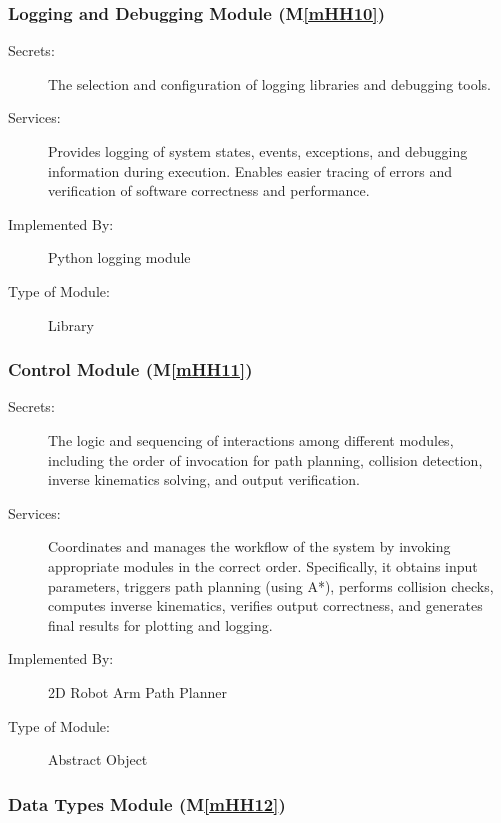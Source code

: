 \documentclass[12pt, titlepage]{article}
\newcommand{\mref}[1]{M\ref{#1}}
\begin{document}
\subsubsection{Logging and Debugging Module (\mref{mHH10})}

\begin{description}
\item[Secrets:] The selection and configuration of logging libraries and debugging tools.
\item[Services:] Provides logging of system states, events, exceptions, and debugging information during execution. Enables easier tracing of errors and verification of software correctness and performance.
\item[Implemented By:] Python logging module
\item[Type of Module:] Library
\end{description}

\subsubsection{Control Module (\mref{mHH11})}

\begin{description} \item[Secrets:] The logic and sequencing of interactions among different modules, including the order of invocation for path planning, collision detection, inverse kinematics solving, and output verification.

\item[Services:] Coordinates and manages the workflow of the system by invoking appropriate modules in the correct order. Specifically, it obtains input parameters, triggers path planning (using A*), performs collision checks, computes inverse kinematics, verifies output correctness, and generates final results for plotting and logging.

\item[Implemented By:] 2D Robot Arm Path Planner

\item[Type of Module:] Abstract Object \end{description}

\subsubsection{Data Types Module (\mref{mHH12})}
\end{document}
